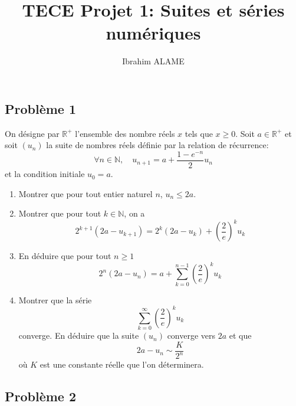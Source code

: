 \documentclass{article}
\title{TECE Projet 1: Suites et séries numériques}
\author{Ibrahim ALAME}
\date{}
\begin{document}
  \lstset{
    frame       = single,
    numbers     = left,
    showspaces  = false,
    showstringspaces    = false,
    captionpos  = t,
    caption     = \lstname
}
\maketitle
\begin{center}
\end{center}
\subsection*{Problème 1}
On désigne par $\mathbb{R}^+$ l'ensemble des nombre réels $x$ tels que $x\geq 0$. Soit $a\in \mathbb{R}^+$ et soit $(u_n)$ la suite de nombres réels définie par la relation de récurrence:
\[\forall n\in \mathbb{N},\quad u_{n+1}=a+\frac{1-e^{-n}}{2}u_n\]
et la condition initiale $u_0=a$.
\begin{enumerate}
\item Montrer que pour tout entier naturel $n$, $u_n\leq 2a$.
\item Montrer que pour tout $k\in \mathbb{N}$, on a
\[2^{k+1}(2a-u_{k+1})=2^k(2a-u_k)+\left(\frac{2}{e}\right)^ku_k\]
\item En déduire que pour tout $n\geq 1$
\[2^n(2a-u_n)=a+\sum_{k=0}^{n-1}\left(\frac{2}{e}\right)^ku_k\]
\item Montrer que la série \[\sum_{k=0}^\infty\left(\frac{2}{e}\right)^ku_k\] converge. En déduire que la suite $(u_n)$ converge vers $2a$ et que \[2a-u_n\sim \frac{K}{2^n}\] où $K$ est une constante réelle que l'on déterminera.
\end{enumerate}

\subsection*{Problème 2}
\end{document}
